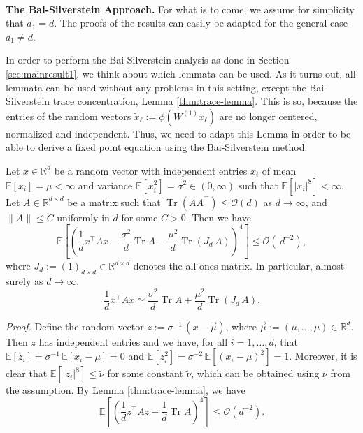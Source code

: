 \documentclass{article}
\begin{document}
\bigskip
\bigskip
\\
\textbf{The Bai-Silverstein Approach.} For what is to come, we assume for simplicity that $d_1=d$. The proofs of the results can easily be adapted for the general case $d_1\neq d$.
\par
In order to perform the Bai-Silverstein analysis as done in Section \ref{sec:mainresult1}, we think about which lemmata can be used. As it turns out, all lemmata can be used without any problems in this setting, except the Bai-Silverstein trace concentration, Lemma \ref{thm:trace-lemma}. This is so, because the entries of the random vectors $\tilde{x}_\ell:=\phi(W^{(1)}x_\ell)$ are no longer centered, normalized and independent. Thus, we need to adapt this Lemma in order to be able to derive a fixed point equation using the Bai-Silverstein method.
\bigskip
\\
\begin{lemma}\label{thm:general-trace-lemma}
Let $x\in\mathbb{R}^d$ be a random vector with independent entries $x_i$ of mean $\mathbb{E}[x_i]=\mu<\infty$ and variance $\mathbb{E}[x_i^2]=\sigma^2\in(0,\infty)$ such that $\mathbb{E}[|x_i|^8]<\infty$. Let $A\in\mathbb{R}^{d\times d}$ be a matrix such that $\operatorname{Tr}(AA^\top)\leq\mathcal{O}(d)$ as $d\to\infty$, and $\|A\|\leq C$ uniformly in $d$ for some $C>0$. Then we have
$$\mathbb{E}\left[\left(\frac{1}{d}x^\top Ax-\frac{\sigma^2}{d}\operatorname{Tr}A-\frac{\mu^2}{d}\operatorname{Tr}(J_d\,A)\right)^4\right]\leq\mathcal{O}(\,d^{-2}),$$
where $J_d:=(1)_{d\times d}\in\mathbb{R}^{d\times d}$ denotes the all-ones matrix. In particular, almost surely as $d\to\infty$,
$$\frac{1}{d}x^\top Ax\simeq \frac{\sigma^2}{d}\operatorname{Tr}A+\frac{\mu^2}{d}\operatorname{Tr}(J_d\,A).$$
\end{lemma}
\smallskip
\noindent
\emph{Proof.} Define the random vector $z:=\sigma^{-1}\,(x-\vec{\mu})$, where $\vec{\mu}:=(\mu,\dots,\mu)\in\mathbb{R}^d$. Then $z$ has independent entries and we have, for all $i=1,\dots,d$, that $\mathbb{E}[z_i]=\sigma^{-1}\,\mathbb{E}[x_i-\mu]=0$ and $\mathbb{E}[z_i^2]=\sigma^{-2}\,\mathbb{E}[(x_i-\mu)^2]=1$. Moreover, it is clear that $\mathbb{E}[|z_i|^8]\leq\tilde{\nu}$ for some constant $\tilde{\nu}$, which can be obtained using $\nu$ from the assumption. By Lemma \ref{thm:trace-lemma}, we have
\begin{equation}
\mathbb{E}\left[\left(\frac{1}{d}z^\top A z-\frac{1}{d}\operatorname{Tr}A\right)^4\right]\leq\mathcal{O}(d^{-2}).
\end{equation}
\end{document}

